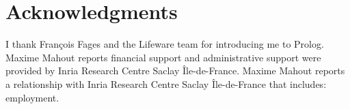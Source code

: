 \documentclass{eptcs}
\begin{document}



\section*{Acknowledgments}
I thank François Fages and the Lifeware team for introducing me to Prolog. Maxime Mahout reports financial support and administrative support were provided by Inria Research Centre Saclay Île-de-France. Maxime Mahout reports a relationship with Inria Research Centre Saclay Île-de-France that includes: employment. %

\end{document}

